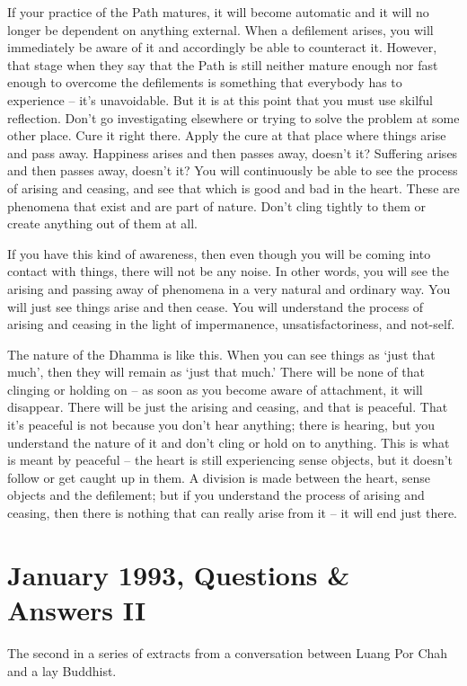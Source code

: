 If your practice of the Path matures, it will become automatic and it
will no longer be dependent on anything external. When a defilement
arises, you will immediately be aware of it and accordingly be able to
counteract it. However, that stage when they say that the Path is still
neither mature enough nor fast enough to overcome the defilements is
something that everybody has to experience -- it's unavoidable. But it
is at this point that you must use skilful reflection. Don't go
investigating elsewhere or trying to solve the problem at some other
place. Cure it right there. Apply the cure at that place where things
arise and pass away. Happiness arises and then passes away, doesn't it?
Suffering arises and then passes away, doesn't it? You will continuously
be able to see the process of arising and ceasing, and see that which is
good and bad in the heart. These are phenomena that exist and are part
of nature. Don't cling tightly to them or create anything out of them at
all.

If you have this kind of awareness, then even though you will be coming
into contact with things, there will not be any noise. In other words,
you will see the arising and passing away of phenomena in a very natural
and ordinary way. You will just see things arise and then cease. You
will understand the process of arising and ceasing in the light of
impermanence, unsatisfactoriness, and not-self.

The nature of the Dhamma is like this. When you can see things as `just
that much', then they will remain as `just that much.' There will be
none of that clinging or holding on -- as soon as you become aware of
attachment, it will disappear. There will be just the arising and
ceasing, and that is peaceful. That it's peaceful is not because you
don't hear anything; there is hearing, but you understand the nature of
it and don't cling or hold on to anything. This is what is meant by
peaceful -- the heart is still experiencing sense objects, but it
doesn't follow or get caught up in them. A division is made between the
heart, sense objects and the defilement; but if you understand the
process of arising and ceasing, then there is nothing that can really
arise from it -- it will end just there.

\chapter{January 1993, Questions \& Answers II}

The second in a series of extracts from a conversation between Luang Por
Chah and a lay Buddhist.

